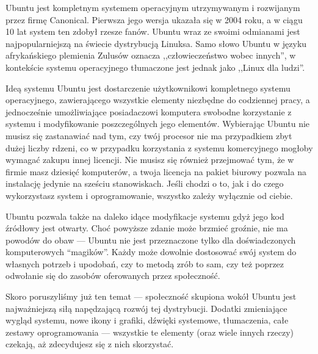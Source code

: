 Ubuntu jest kompletnym systemem operacyjnym utrzymywanym i rozwijanym przez firmę Canonical. Pierwsza jego wersja ukazała się w 2004 roku, a w ciągu 10 lat system ten zdobył rzesze fanów. Ubuntu wraz ze swoimi odmianami jest najpopularniejszą na świecie dystrybucją Linuksa. Samo słowo Ubuntu w języku afrykańskiego plemienia Zulusów oznacza ,,człowieczeństwo wobec innych'', w kontekście systemu operacyjnego tłumaczone jest jednak jako ,,Linux dla ludzi''.

Ideą systemu Ubuntu jest dostarczenie użytkownikowi kompletnego systemu operacyjnego, zawierającego wszystkie elementy niezbędne do codziennej pracy, a jednocześnie umożliwiające posiadaczowi komputera swobodne korzystanie z systemu i modyfikowanie poszczególnych jego elementów. Wybierając Ubuntu nie musisz się zastanawiać nad tym, czy twój procesor nie ma przypadkiem zbyt dużej liczby rdzeni, co w przypadku korzystania z systemu komercyjnego mogłoby wymagać zakupu innej licencji. Nie musisz się również przejmować tym, że w firmie masz dziesięć komputerów, a twoja licencja na pakiet biurowy pozwala na instalację jedynie na sześciu stanowiskach. Jeśli chodzi o to, jak i do czego wykorzystasz system i oprogramowanie, wszystko zależy wyłącznie od ciebie.

Ubuntu pozwala także na daleko idące modyfikacje systemu gdyż jego kod źródłowy jest otwarty. Choć powyższe zdanie może brzmieć groźnie, nie ma powodów do obaw --- Ubuntu nie jest przeznaczone tylko dla doświadczonych komputerowych “magików”. Każdy może dowolnie dostosować swój system do własnych potrzeb i upodobań, czy to metodą zrób to sam, czy też poprzez odwołanie się do zasobów oferowanych przez społeczność.

Skoro poruszyliśmy już ten temat --- społeczność skupiona wokół Ubuntu jest najważniejszą siłą napędzającą rozwój tej dystrybucji. Dodatki zmieniające wygląd systemu, nowe ikony i grafiki, dźwięki systemowe, tłumaczenia, całe zestawy oprogramowania --- wszystkie te elementy (oraz wiele innych rzeczy) czekają, aż zdecydujesz się z nich skorzystać.